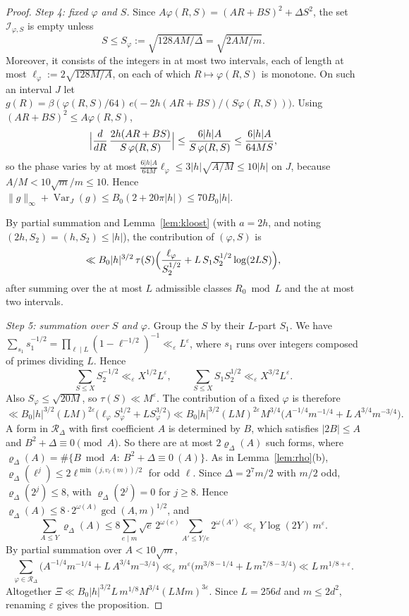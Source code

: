 \documentclass[11pt]{amsart}
\theoremstyle{remark}
\theoremstyle{definition}
\numberwithin{equation}{section}
\newcommand{\eps}{\varepsilon}
\newcommand{\Var}{\operatorname{Var}}
\begin{document}
\begin{proof}
\emph{Step 4: fixed $\varphi$ and $S$.} Since $A\varphi(R,S)=(AR+BS)^2+\Delta S^2$, the set $\mathcal I_{\varphi,S}$ is empty unless
\[
S\le S_\varphi:=\sqrt{128AM/\Delta}=\sqrt{2AM/m}.
\]
Moreover, it consists of the integers in at most two intervals, each of length at most $\ell_\varphi:=2\sqrt{128M/A}$, on each of which $R\mapsto\varphi(R,S)$ is monotone. On such an interval $J$ let $g(R)=\beta(\varphi(R,S)/64)\,e\bigl(-2h(AR+BS)/(S\varphi(R,S))\bigr)$. Using $(AR+BS)^2\le A\varphi(R,S)$,
\[
\Bigl|\frac{d}{dR}\,\frac{2h(AR+BS)}{S\,\varphi(R,S)}\Bigr|\le\frac{6|h|A}{S\,\varphi(R,S)}\le\frac{6|h|A}{64MS},
\]
so the phase varies by at most $\frac{6|h|A}{64M}\ell_\varphi\le 3|h|\sqrt{A/M}\le 10|h|$ on $J$, because $A/M<10\sqrt m/m\le10$. Hence $\|g\|_\infty+\Var_J(g)\le B_0(2+20\pi|h|)\le 70B_0|h|$.

By partial summation and Lemma~\ref{lem:kloost} (with $a=2h$, and noting $(2h,S_2)=(h,S_2)\le|h|$), the contribution of $(\varphi,S)$ is
\[
\ll B_0|h|^{3/2}\,\tau(S)\Bigl(\frac{\ell_\varphi}{S_2^{1/2}}+L\,S_1S_2^{1/2}\log(2LS)\Bigr),
\]
after summing over the at most $L$ admissible classes $R_0\bmod L$ and the at most two intervals.

\emph{Step 5: summation over $S$ and $\varphi$.} Group the $S$ by their $L$-part $S_1$. We have $\sum_{s_1}s_1^{-1/2}=\prod_{\ell\mid L}(1-\ell^{-1/2})^{-1}\ll_\eps L^{\eps}$, where $s_1$ runs over integers composed of primes dividing $L$. Hence
\[
\sum_{S\le X}S_2^{-1/2}\ll_\eps X^{1/2}L^{\eps},\qquad\sum_{S\le X}S_1S_2^{1/2}\ll_\eps X^{3/2}L^{\eps}.
\]
Also $S_\varphi\le\sqrt{20M}$, so $\tau(S)\ll M^{\eps}$. The contribution of a fixed $\varphi$ is therefore
\[
\ll B_0|h|^{3/2}(LM)^{2\eps}\bigl(\ell_\varphi S_\varphi^{1/2}+L S_\varphi^{3/2}\bigr)\ll B_0|h|^{3/2}(LM)^{2\eps}M^{3/4}\bigl(A^{-1/4}m^{-1/4}+L\,A^{3/4}m^{-3/4}\bigr).
\]
A form in $\mathcal R_\Delta$ with first coefficient $A$ is determined by $B$, which satisfies $|2B|\le A$ and $B^2+\Delta\equiv0\pmod A$. So there are at most $2\varrho_\Delta(A)$ such forms, where $\varrho_\Delta(A)=\#\{B\bmod A:\ B^2+\Delta\equiv0\ (A)\}$. As in Lemma~\ref{lem:rho}(b), $\varrho_\Delta(\ell^j)\le 2\ell^{\min(j,v_\ell(m))/2}$ for odd $\ell$. Since $\Delta=2^7m/2$ with $m/2$ odd, $\varrho_\Delta(2^j)\le 8$, with $\varrho_\Delta(2^j)=0$ for $j\ge 8$. Hence $\varrho_\Delta(A)\le 8\cdot 2^{\omega(A)}\gcd(A,m)^{1/2}$, and
\[
\sum_{A\le Y}\varrho_\Delta(A)\le 8\sum_{e\mid m}\sqrt e\,2^{\omega(e)}\sum_{A'\le Y/e}2^{\omega(A')}\ll_\eps Y\log(2Y)\,m^{\eps}.
\]
By partial summation over $A<10\sqrt m$,
\[
\sum_{\varphi\in\mathcal R_\Delta}\bigl(A^{-1/4}m^{-1/4}+L\,A^{3/4}m^{-3/4}\bigr)\ll_\eps m^{\eps}\bigl(m^{3/8-1/4}+L\,m^{7/8-3/4}\bigr)\ll L\,m^{1/8+\eps}.
\]
Altogether $\Xi\ll B_0|h|^{3/2}L\,m^{1/8}M^{3/4}(LMm)^{3\eps}$. Since $L=256d$ and $m\le2d^2$, renaming $\eps$ gives the proposition.
\end{proof}
\end{document}
